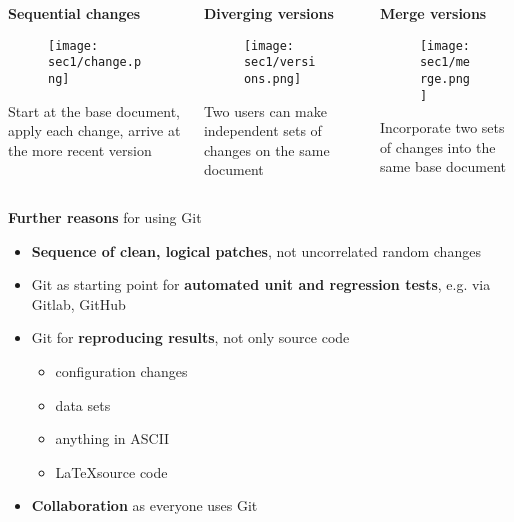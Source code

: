 \begin{frame}[fragile]
\emptyframetitle
  \begin{columns}
    \begin{column}{0.33\textwidth}
{\bf Sequential changes}
      \begin{figure}[h]
      \texttt{[image: sec1/change.png]}
      \end{figure}
      Start at the base document, apply each change, arrive at the more recent version
    \end{column}
    \begin{column}{0.33\textwidth}
{\bf Diverging versions}
      \begin{figure}[h]
      \texttt{[image: sec1/versions.png]}
      \end{figure}
      Two users can make independent sets of changes on the same document
    \end{column}
    \begin{column}{0.33\textwidth}
{\bf Merge versions}
      \begin{figure}[h]
      \texttt{[image: sec1/merge.png]}
      \end{figure}
      Incorporate two sets of changes into the same base document
    \end{column}

  \end{columns}

\end{frame}

\begin{frame}[fragile]
\emptyframetitle

\textbf{Further reasons} for using Git

\begin{itemize}
\setlength\itemsep{10pt}
  \item \textbf{Sequence of clean, logical patches}, not uncorrelated random changes
  \item Git as starting point for \textbf{automated unit and regression tests}, e.g. via Gitlab, GitHub
  \item Git for \textbf{reproducing results}, not only source code
  \begin{itemize}
    \normalsize
    \item configuration changes
    \item data sets
    \item anything in ASCII
    \item \LaTeX source code
  \end{itemize}
  \item \textbf{Collaboration} as everyone uses Git
\end{itemize}
\end{frame}

